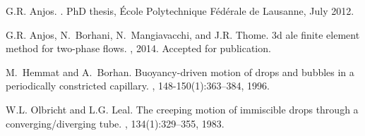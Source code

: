 \documentclass{Eccomas}
\begin{document}
\begin{thebibliography}{99}
\setlength{\parskip}{0pt}

G.R. Anjos.
.
\newblock PhD thesis, \'Ecole Polytechnique F\'ed\'erale de Lausanne, July
  2012.

G.R. Anjos, N.~Borhani, N.~Mangiavacchi, and J.R. Thome.
\newblock 3d ale finite element method for two-phase flows.
, 2014.
\newblock Accepted for publication.

M.~Hemmat and A.~Borhan.
\newblock Buoyancy-driven motion of drops and bubbles in a periodically
  constricted capillary.
, 148-150(1):363--384, 1996.

W.L. Olbricht and L.G. Leal.
\newblock The creeping motion of immiscible drops through a
  converging/diverging tube.
, 134(1):329--355, 1983.

%

\end{thebibliography}
\end{document}

